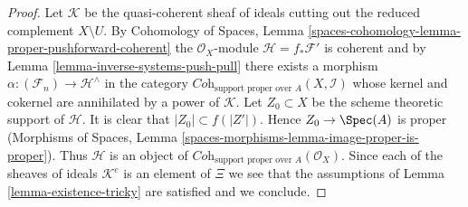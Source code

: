 \begin{proof}
\medskip\noindent
Let $\mathcal{K}$ be the quasi-coherent sheaf of ideals cutting
out the reduced complement $X \setminus U$.
By Cohomology of Spaces, Lemma
\ref{spaces-cohomology-lemma-proper-pushforward-coherent}
the $\mathcal{O}_X$-module $\mathcal{H} = f_*\mathcal{F}'$ is coherent
and by Lemma \ref{lemma-inverse-systems-push-pull}
there exists a morphism $\alpha : (\mathcal{F}_n) \to \mathcal{H}^\wedge$
in the category $\textit{Coh}_{\text{support proper over } A}(X, \mathcal{I})$
whose kernel and cokernel are annihilated by a power of $\mathcal{K}$.
Let $Z_0 \subset X$ be the scheme theoretic support of $\mathcal{H}$.
It is clear that $|Z_0| \subset f(|Z'|)$. Hence
$Z_0 \to \Spec(A)$ is proper
(Morphisms of Spaces, Lemma
\ref{spaces-morphisms-lemma-image-proper-is-proper}).
Thus $\mathcal{H}$ is an object of 
$\textit{Coh}_{\text{support proper over } A}(\mathcal{O}_X)$.
Since each of the sheaves of ideals $\mathcal{K}^e$ is an element of
$\Xi$ we see that the assumptions of Lemma \ref{lemma-existence-tricky}
are satisfied and we conclude.
\end{proof}
